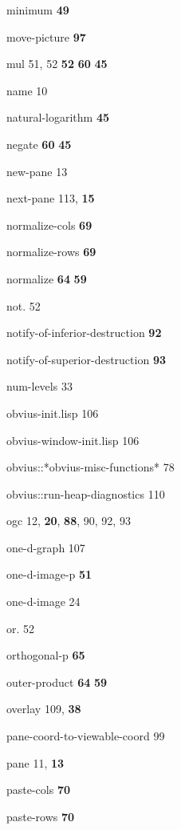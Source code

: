 \begin{theindex}
\item {\ptt minimum}
 {\bf 49}
\item {\ptt move-picture} {\bf 97}
\item {\ptt mul} 51, 52
 {\bf 52}
 {\bf 60}
 {\bf 45}
\item {\ptt name} 10
\item {\ptt natural-logarithm}
 {\bf 45}
\item {\ptt negate}
 {\bf 60}
 {\bf 45}
\item {\ptt new-pane} 13
\item {\ptt next-pane} 113, {\bf 15}
\item {\ptt normalize-cols} {\bf 69}
\item {\ptt normalize-rows} {\bf 69}
\item {\ptt normalize}
 {\bf 64}
 {\bf 59}
\item {\ptt not.} 52
\item {\ptt notify-of-inferior-destruction} {\bf 92}
\item {\ptt notify-of-superior-destruction} {\bf 93}
\item {\ptt num-levels} 33
\item {\ptt obvius-init.lisp} 106
\item {\ptt obvius-window-init.lisp} 106
\item {\ptt obvius::*obvius-misc-functions*} 78
\item {\ptt obvius::run-heap-diagnostics} 110
\item {\ptt ogc} 12, {\bf 20}, {\bf 88}, 90, 92, 93
\item {\ptt one-d-graph} 107
\item {\ptt one-d-image-p} {\bf 51}
\item {\ptt one-d-image} 24
\item {\ptt or.} 52
\item {\ptt orthogonal-p} {\bf 65}
\item {\ptt outer-product}
 {\bf 64}
 {\bf 59}
\item {\ptt overlay} 109, {\bf 38}
\item {\ptt pane-coord-to-viewable-coord} 99
\item {\ptt pane} 11, {\bf 13}
\item {\ptt paste-cols} {\bf 70}
\item {\ptt paste-rows} {\bf 70}

\end{theindex}
